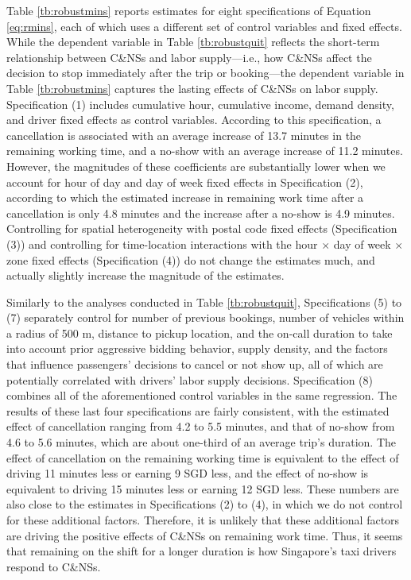 \documentclass[reviewmode]{AEA}
\begin{document}
Table \ref{tb:robustmins} reports estimates for eight specifications of Equation \eqref{eq:rmins}, each of which uses a different set of control variables and fixed effects. While the dependent variable in Table \ref{tb:robustquit} reflects the short-term relationship between C\&NSs and labor supply---i.e., how C\&NSs affect the decision to stop immediately after the trip or booking---the dependent variable in Table \ref{tb:robustmins} captures the lasting effects of C\&NSs on labor supply. Specification (1) includes cumulative hour, cumulative income, demand density, and driver fixed effects as control variables. According to this specification, a cancellation is associated with an average increase of 13.7 minutes in the remaining working time, and a no-show with an average increase of 11.2 minutes. However, the magnitudes of these coefficients are substantially lower when we account for hour of day and day of week fixed effects in Specification (2), according to which the estimated increase in remaining work time after a cancellation is only 4.8 minutes and the increase after a no-show is 4.9 minutes. Controlling for spatial heterogeneity with  postal code fixed effects (Specification (3)) and controlling for time-location interactions with the hour $\times$ day of week $\times$ zone fixed effects (Specification (4)) do not change the estimates much, and actually slightly increase the magnitude of the estimates. 

Similarly to the analyses conducted in Table \ref{tb:robustquit}, Specifications (5) to (7) separately control for number of previous bookings, number of vehicles within a radius of 500 m, distance to pickup location, and the on-call duration to take into account prior aggressive bidding behavior, supply density, and the factors that influence passengers' decisions to cancel or not show up, all of which are potentially correlated with drivers' labor supply decisions. Specification (8) combines all of the aforementioned control variables in the same regression. The results of these last four specifications are fairly consistent, with the estimated effect of cancellation ranging from 4.2 to 5.5 minutes, and that of no-show from 4.6 to 5.6 minutes, which are about one-third of an average trip's duration. The effect of cancellation on the remaining working time is equivalent to the effect of driving 11 minutes less or earning 9 SGD less, and the effect of no-show is equivalent to driving 15 minutes less or earning 12 SGD less. These numbers are also close to the estimates in Specifications (2) to (4), in which we do not control for these additional factors. Therefore, it is unlikely that these additional factors are driving the positive effects of C\&NSs on remaining work time. Thus, it seems that remaining on the shift for a longer duration is how Singapore's taxi drivers respond to C\&NSs.
\end{document}
